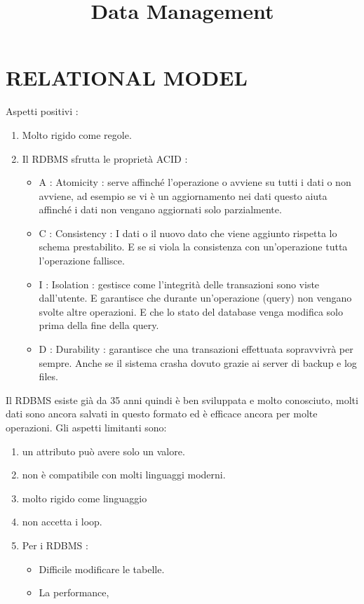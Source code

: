\documentclass[a4page, 11pt]{article}
\title{Data Management}
\author{}
\date{}
\begin{document}
\maketitle

\section{RELATIONAL MODEL}

Aspetti positivi :

\begin{enumerate}[noitemsep]
	 
	\item
	Molto rigido come regole.
	\item
	Il RDBMS sfrutta le proprietà ACID :
	\begin{itemize}
		
		\item
		A : Atomicity : serve affinché l'operazione o avviene su tutti i dati o non avviene, ad esempio se vi è un aggiornamento nei dati questo aiuta affinché i dati non vengano aggiornati solo parzialmente.
		\item
		C : Consistency : I dati o il nuovo dato che viene aggiunto rispetta lo schema prestabilito. E se si viola la consistenza con un'operazione tutta l'operazione fallisce.
		\item
		I : Isolation : gestisce come l'integrità delle transazioni sono viste dall'utente. E garantisce che durante un'operazione (query) non vengano svolte altre operazioni. E che lo stato del database venga modifica solo prima della fine della query.
		\item
		D : Durability : garantisce che una transazioni effettuata sopravvivrà per sempre. Anche se il sistema crasha dovuto grazie ai server di
		backup e log files.
	\end{itemize}
\end{enumerate}




Il RDBMS esiste già da 35 anni quindi è ben sviluppata e molto conosciuto, molti dati sono ancora salvati in questo formato ed è efficace ancora per molte operazioni. Gli aspetti limitanti sono:

\begin{enumerate}[noitemsep]
	 
	\item
	un attributo può avere solo un valore.
	\item
	non è compatibile con molti linguaggi moderni.
	\item
	molto rigido come linguaggio
	\item
	non accetta i loop.
	\item
	Per i RDBMS :
	\begin{itemize}
		
		\item
		Difficile modificare le tabelle.
		\item
		La performance,
	\end{itemize}
\end{enumerate}
\end{document}
